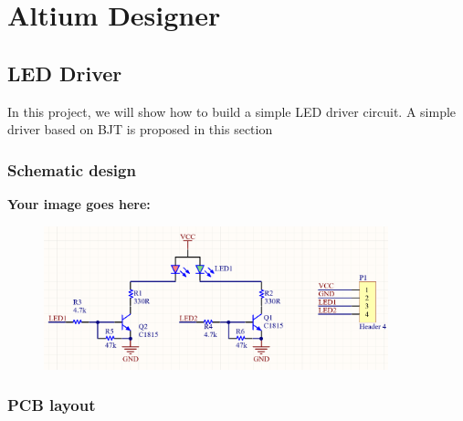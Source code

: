 \section{Altium Designer}
\subsection{LED Driver}
In this project, we will show how to build a simple LED driver circuit. A simple driver
 based on BJT is proposed in this section
\subsubsection{Schematic design}
\textbf{Your image goes here:}
\begin{figure}[h!]
    \centering
    \includegraphics[width=0.89\textwidth]{graphics/ex2/f1.png}
\end{figure}

\subsubsection{PCB layout}

